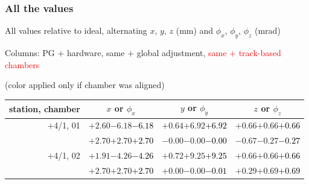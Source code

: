 \documentclass[compress]{beamer}
\begin{document}
\begin{frame}
\frametitle{All the values}
\tiny

All values relative to ideal, alternating $x$, $y$, $z$ (mm) and $\phi_x$, $\phi_y$, $\phi_z$ (mrad)

Columns: PG $+$ hardware, same $+$ global adjustment, \textcolor{red}{same $+$ track-based chambers}

\hfill (color applied only if chamber was aligned)

\vfill
\renewcommand{\arraystretch}{1.1}
\begin{tabular}{r | c | c | c}
station, chamber & $x$ or $\phi_x$ & $y$ or $\phi_y$ & $z$ or $\phi_z$ \\\hline
$+$4/1, 01 & $+2.60$\hspace{0.1 cm}$-6.18$\hspace{0.1 cm}\textcolor{black}{$-6.18$} & $+0.64$\hspace{0.1 cm}$+6.92$\hspace{0.1 cm}\textcolor{black}{$+6.92$} & $+0.66$\hspace{0.1 cm}$+0.66$\hspace{0.1 cm}\textcolor{black}{$+0.66$} \\
           & $+2.70$\hspace{0.1 cm}$+2.70$\hspace{0.1 cm}\textcolor{black}{$+2.70$} & $-0.00$\hspace{0.1 cm}$-0.00$\hspace{0.1 cm}\textcolor{black}{$-0.00$} & $-0.67$\hspace{0.1 cm}$-0.27$\hspace{0.1 cm}\textcolor{black}{$-0.27$} \\
$+$4/1, 02 & $+1.91$\hspace{0.1 cm}$-4.26$\hspace{0.1 cm}\textcolor{black}{$-4.26$} & $+0.72$\hspace{0.1 cm}$+9.25$\hspace{0.1 cm}\textcolor{black}{$+9.25$} & $+0.66$\hspace{0.1 cm}$+0.66$\hspace{0.1 cm}\textcolor{black}{$+0.66$} \\
           & $+2.70$\hspace{0.1 cm}$+2.70$\hspace{0.1 cm}\textcolor{black}{$+2.70$} & $+0.00$\hspace{0.1 cm}$-0.00$\hspace{0.1 cm}\textcolor{black}{$-0.01$} & $+0.29$\hspace{0.1 cm}$+0.69$\hspace{0.1 cm}\textcolor{black}{$+0.69$} \\

\end{tabular}
\end{frame}
\end{document}
